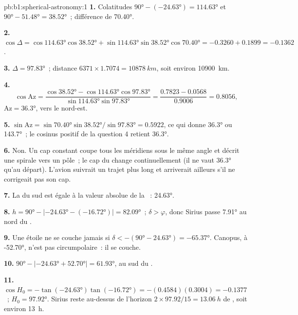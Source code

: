 \begin{solution}{pb:b1:spherical-astronomy:1}
\textbf{1.} Colatitudes $\ang{90} - (\ang{-24.63}) = \ang{114.63}$ et
$\ang{90} - \ang{51.48} = \ang{38.52}$~; différence de  \ang{70.40}.

\textbf{2.} $\cos\Delta = \cos\ang{114.63}\cos\ang{38.52} +
\sin\ang{114.63}\sin\ang{38.52}\cos\ang{70.40} = -0.3260 + 0.1899 =
-0.1362$.

\textbf{3.} $\Delta = \ang{97.83}$~; distance $6371\times1.7074 =
\qty{10878}{km}$, soit environ \qty{10900}{km}.

\textbf{4.}
\[
  \cos\mathrm{Az} = \frac{\cos\ang{38.52} - \cos\ang{114.63}\cos\ang{97.83}}
  {\sin\ang{114.63}\sin\ang{97.83}} = \frac{0.7823 - 0.0568}{0.9006} = 0.8056 ,
\]
$\mathrm{Az} = \ang{36.3}$, vers le nord-est.

\textbf{5.} $\sin\mathrm{Az} = \sin\ang{70.40}\sin\ang{38.52}/\sin\ang{97.83}
= 0.5922$, ce qui donne \ang{36.3} ou \ang{143.7}~; le cosinus positif de la
question 4 retient \ang{36.3}.

\textbf{6.} Non. Un cap constant coupe tous les méridiens sous le même angle et
décrit une spirale vers un pôle~; le cap du  change continuellement
(il ne vaut \ang{36.3} qu'au départ). L'avion suivrait un trajet plus long et
arriverait ailleurs s'il ne corrigeait pas son cap.

\textbf{7.} La  du  sud est égale à la valeur absolue de la
~: \ang{24.63}.

\textbf{8.} $h = \ang{90} - |\ang{-24.63} - (\ang{-16.72})| = \ang{82.09}$~;
$\delta > \varphi$, donc Sirius passe \ang{7.91} au nord du .

\textbf{9.} Une étoile ne se couche jamais si $\delta < -(\ang{90} - \ang{24.63}) =
\ang{-65.37}$. Canopus, à \ang{-52.70}, n'est pas circumpolaire~: il se couche.

\textbf{10.} $\ang{90} - |\ang{-24.63} + \ang{52.70}| = \ang{61.93}$, au sud
du .

\textbf{11.} $\cos H_0 = -\tan(\ang{-24.63})\tan(\ang{-16.72}) =
-(0.4584)(0.3004) = -0.1377$~; $H_0 = \ang{97.92}$. Sirius reste au-dessus de
l'horizon $2\times97.92/15 = \qty{13.06}{h}$ de , soit environ
\qty{13}{h}.


\end{solution}
